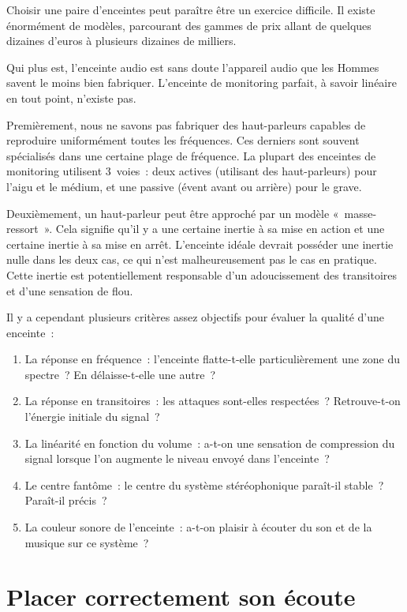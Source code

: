 \documentclass[
]{book}
\providecommand{\tightlist}{%
  \setlength{\itemsep}{0pt}\setlength{\parskip}{0pt}}
\begin{document}
Choisir une paire d'enceintes peut paraître être un exercice difficile. Il existe énormément de modèles, parcourant des gammes de prix allant de quelques dizaines d'euros à plusieurs dizaines de milliers.

Qui plus est, l'enceinte audio est sans doute l'appareil audio que les Hommes savent le moins bien fabriquer. L'enceinte de monitoring parfait, à savoir linéaire en tout point, n'existe pas.

Premièrement, nous ne savons pas fabriquer des haut-parleurs capables de reproduire uniformément toutes les fréquences. Ces derniers sont souvent spécialisés dans une certaine plage de fréquence. La plupart des enceintes de monitoring utilisent 3~voies~: deux actives (utilisant des haut-parleurs) pour l'aigu et le médium, et une passive (évent avant ou arrière) pour le grave.

Deuxièmement, un haut-parleur peut être approché par un modèle «~masse-ressort~». Cela signifie qu'il y a une certaine inertie à sa mise en action et une certaine inertie à sa mise en arrêt. L'enceinte idéale devrait posséder une inertie nulle dans les deux cas, ce qui n'est malheureusement pas le cas en pratique. Cette inertie est potentiellement responsable d'un adoucissement des transitoires et d'une sensation de flou.

Il y a cependant plusieurs critères assez objectifs pour évaluer la qualité d'une enceinte~:

\begin{enumerate}
\def\labelenumi{\arabic{enumi}.}
\tightlist
\item
  La réponse en fréquence~: l'enceinte flatte-t-elle particulièrement une zone du spectre~? En délaisse-t-elle une autre~?
\item
  La réponse en transitoires~: les attaques sont-elles respectées~? Retrouve-t-on l'énergie initiale du signal~?
\item
  La linéarité en fonction du volume~: a-t-on une sensation de compression du signal lorsque l'on augmente le niveau envoyé dans l'enceinte~?
\item
  Le centre fantôme~: le centre du système stéréophonique paraît-il stable~? Paraît-il précis~?
\item
  La couleur sonore de l'enceinte~: a-t-on plaisir à écouter du son et de la musique sur ce système~?
\end{enumerate}

\hypertarget{placer-correctement-son-uxe9coute}{%
\section{Placer correctement son écoute}\label{placer-correctement-son-uxe9coute}}
\end{document}

